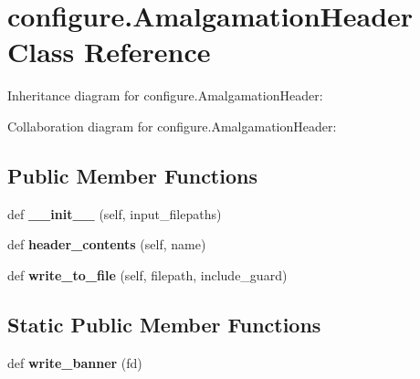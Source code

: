 \hypertarget{classconfigure_1_1_amalgamation_header}{}\section{configure.\+Amalgamation\+Header Class Reference}
\label{classconfigure_1_1_amalgamation_header}


Inheritance diagram for configure.\+Amalgamation\+Header\+:


Collaboration diagram for configure.\+Amalgamation\+Header\+:
\subsection*{Public Member Functions}
\begin{DoxyCompactItemize}
\item 
\mbox{\label{classconfigure_1_1_amalgamation_header_ab01ef882d2422df43151ae7d4d9ac09d}} 
def {\bfseries \+\_\+\+\_\+init\+\_\+\+\_\+} (self, input\+\_\+filepaths)
\item 
\mbox{\label{classconfigure_1_1_amalgamation_header_a1e6298df364a3bb6521a87c2e6b989f6}} 
def {\bfseries header\+\_\+contents} (self, name)
\item 
\mbox{\label{classconfigure_1_1_amalgamation_header_a11c7f3354e7a7bdca732f3b610e9d608}} 
def {\bfseries write\+\_\+to\+\_\+file} (self, filepath, include\+\_\+guard)
\end{DoxyCompactItemize}
\subsection*{Static Public Member Functions}
\begin{DoxyCompactItemize}
\item 
\mbox{\label{classconfigure_1_1_amalgamation_header_a5ccfb2c2cb3c8ed5a4583e1c42870586}} 
def {\bfseries write\+\_\+banner} (fd)
\end{DoxyCompactItemize}
